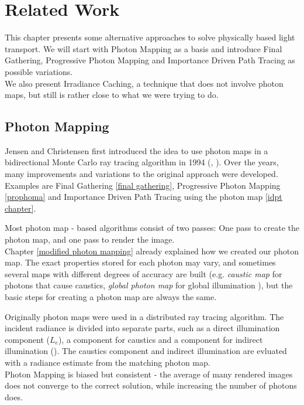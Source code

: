 \chapter{Related Work}
\label{chapter:relatedWork}

This chapter presents some alternative approaches to solve physically based light transport. We will start with Photon Mapping as a basis and introduce Final Gathering, Progressive Photon Mapping and Importance Driven Path Tracing as possible variations.\\
We also present Irradiance Caching, a technique that does not involve photon maps, but still is rather close to what we were trying to do.

\section{Photon Mapping}
\label{photon mapping}

Jensen and Christensen first introduced the idea to use photon maps in a bidirectional Monte Carlo ray tracing algorithm in 1994 (\cite{phomaps0}, \cite{phomaps1}). Over the years, many improvements and variations to the original approach were developed. Examples are Final Gathering \ref{final gathering}, Progressive Photon Mapping \ref{prophoma} and Importance Driven Path Tracing using the photon map \ref{idpt chapter}.

Most photon map - based algorithms consist of two passes: One pass to create the photon map, and one pass to render the image.\\
Chapter \ref{modified photon mapping} already explained how we created our photon map. The exact properties stored for each photon may vary, and sometimes several maps with different degrees of accuracy are built (e.g. \emph{caustic map} for photons that cause caustics, \emph{global photon map} for global illumination \cite[chapter 1.5]{phomaps2}), but the basic steps for creating a photon map are always the same.

Originally photon maps were used in a distributed ray tracing algorithm. The incident radiance is divided into separate parts, such as a direct illumination component ($L_e$), a component for caustics and a component for indirect illumination (\cite{phomaps2}). The caustics component and indirect illumination are evluated with a radiance estimate from the matching photon map.\\
Photon Mapping is biased but consistent - the average of many rendered images does not converge to the correct solution, while increasing the number of photons does.


